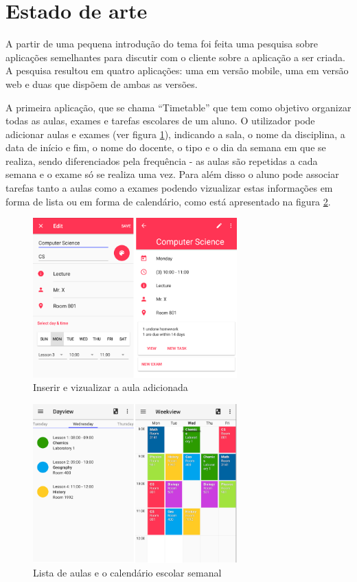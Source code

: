 \documentclass[11pt, twoside]{report}
\begin{document}
	\section{Estado de arte}
	\label{estadodearte}
	
	A partir de uma pequena introdução do tema foi feita uma pesquisa sobre aplicações semelhantes para discutir com o cliente sobre a aplicação a ser criada. A pesquisa resultou em quatro aplicações: uma em versão mobile, uma em versão web e duas que dispõem de ambas as versões.
	
	A primeira aplicação, que se chama ``Timetable'' que tem como objetivo organizar todas as aulas, exames e tarefas escolares de um aluno. O utilizador pode adicionar aulas e exames (ver figura \ref{inserirvizualizaraula}), indicando a sala, o nome da disciplina, a data de início e fim, o nome do docente, o tipo e o dia da semana em que se realiza, sendo diferenciados pela frequência - as aulas são repetidas a cada semana e o exame só se realiza uma vez. Para além disso o aluno pode associar tarefas tanto a aulas como a exames podendo vizualizar estas informações em forma de lista ou em forma de calendário, como está apresentado na figura \ref{dayweekview}.
		\begin{figure}[H] 
		\centering 
		\includegraphics[width=0.7\textwidth,height=0.7\textheight,keepaspectratio]{image/estadodearte/inserirevizualizar}
		\caption{Inserir e vizualizar a aula adicionada}
		\label{inserirvizualizaraula}
	\end{figure}

	\begin{figure}[H] 
		\centering 
		\includegraphics[width=0.7\textwidth,height=0.7\textheight,keepaspectratio]{image/estadodearte/dayweekview}
		\caption{Lista de aulas e o calendário escolar semanal}
		\label{dayweekview}
	\end{figure}
\end{document}
